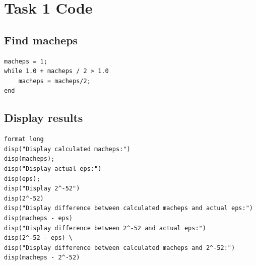 \section{Task 1 Code}
\hypertarget{function1_macheps}{\subsection{Find macheps}}
\begin{lstlisting}
macheps = 1;
while 1.0 + macheps / 2 > 1.0
    macheps = macheps/2;
end
\end{lstlisting}
\newpage
\hypertarget{function1_display}{\subsection{Display results}}
\begin{simplechar}
\begin{lstlisting}
format long
disp("Display calculated macheps:")
disp(macheps);
disp("Display actual eps:")
disp(eps);
disp("Display 2^-52")
disp(2^-52)
disp("Display difference between calculated macheps and actual eps:")
disp(macheps - eps)
disp("Display difference between 2^-52 and actual eps:")
disp(2^-52 - eps) \
disp("Display difference between calculated macheps and 2^-52:")
disp(macheps - 2^-52)
\end{lstlisting}
\end{simplechar}

\newpage
